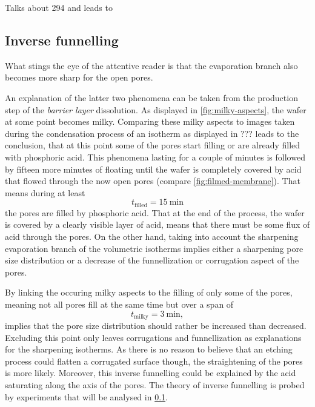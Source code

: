 \documentclass[../thesis.tex]{subfiles}
\begin{document}
          Talks about 294 and leads to


        \subsection{Inverse funnelling}
        \label{subsec:inverse-funnelling}

          What stings the eye of the attentive reader is that the evaporation branch also becomes more sharp for the open pores.

          An explanation of the latter two phenomena can be taken from the production step of the \textit{barrier layer} dissolution. As displayed in \cref{fig:milky-aspects}, the wafer at some point becomes milky. Comparing these milky aspects to images taken during the condensation process of an isotherm as displayed in ??? leads to the conclusion, that at this point some of the pores start filling or are already filled with phosphoric acid. This phenomena lasting for a couple of minutes is followed by fifteen more minutes of floating until the wafer is completely covered by acid that flowed through the now open pores (compare \cref{fig:filmed-membrane}). That means during at least
          \begin{equation}
            t_\mathrm{filled}=\SI{15}{\minute}
          \end{equation}
          the pores are filled by phosphoric acid. That at the end of the process, the wafer is covered by a clearly visible layer of acid, means that there must be some flux of acid through the pores. On the other hand, taking into account the sharpening evaporation branch of the volumetric isotherms implies either a sharpening pore size distribution or a decrease of the funnellization or corrugation aspect of the pores.

          By linking the occuring milky aspects to the filling of only some of the pores, meaning not all pores fill at the same time but over a span of
          \begin{equation}
            t_\mathrm{milky}=\SI{3}{\minute},
          \end{equation}
          implies that the pore size distribution should rather be increased than decreased. Excluding this point only leaves corrugations and funnellization as explanations for the sharpening isotherms. As there is no reason to believe that an etching process could flatten a corrugated surface though, the straightening of the pores is more likely. Moreover, this inverse funnelling could be explained by the acid saturating along the axis of the pores. The theory of inverse funnelling is probed by experiments that will be analysed in \cref{subsec:inverse-funnelling}.
\end{document}
